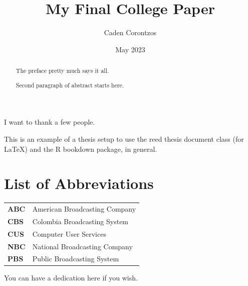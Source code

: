 \documentclass[12pt,twoside]{reedthesis}
\title{My Final College Paper}
\author{Caden Corontzos}
\date{May 2023}
\begin{document}
  \maketitle

\frontmatter %
\pagestyle{empty} %
  \begin{acknowledgements}
    I want to thank a few people.
  \end{acknowledgements}
  \begin{preface}
    This is an example of a thesis setup to use the reed thesis document class
    (for LaTeX) and the R bookdown package, in general.
  \end{preface}
\chapter*{List of Abbreviations}
\begin{table}[h]
    \centering
    \begin{tabular}{ll}
                \textbf{ABC} & American Broadcasting Company \\
                \textbf{CBS} & Colombia Broadcasting System \\
                \textbf{CUS} & Computer User Services \\
                \textbf{NBC} & National Broadcasting Company \\
                \textbf{PBS} & Public Broadcasting System \\
            \end{tabular}
\end{table}
  \hypersetup{linkcolor=black}
  \setcounter{secnumdepth}{2}
  \setcounter{tocdepth}{2}
  \tableofcontents

  \listoftables

  \listoffigures
  \begin{abstract}
    The preface pretty much says it all.

    \par

    Second paragraph of abstract starts here.
  \end{abstract}
  \begin{dedication}
    You can have a dedication here if you wish.
  \end{dedication}
\mainmatter %
\pagestyle{fancyplain} %
\end{document}
